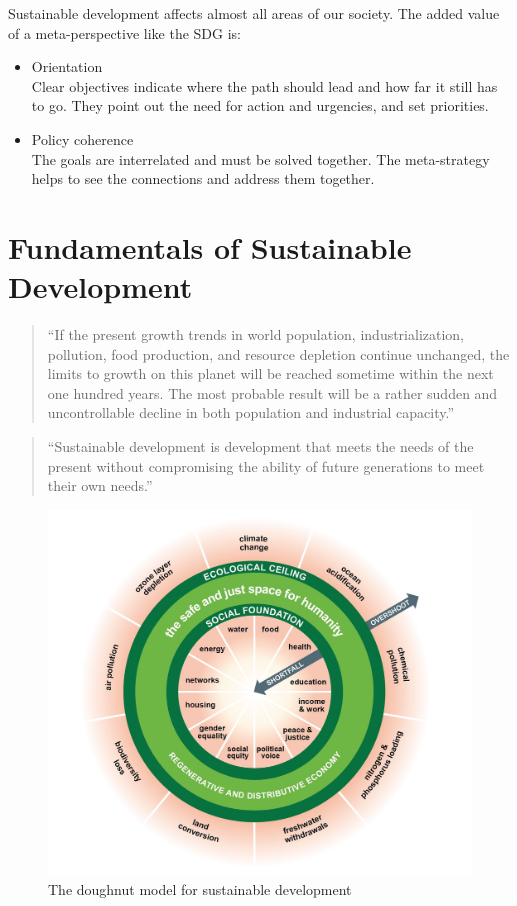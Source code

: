 \documentclass[11pt]{article}
\theoremstyle{definition}
\begin{document}
Sustainable development affects almost all areas of our society. The added value of a meta-perspective like the SDG is:
\begin{itemize}
	\item Orientation\\
	Clear objectives indicate where the path should lead and how far it still has to go. They point out the need for action and urgencies, and set priorities.
	\item Policy coherence\\
	The goals are interrelated and must be solved together. The meta-strategy helps to see the connections and address them together.
\end{itemize}

\section{Fundamentals of Sustainable Development}

\begin{quote}
	\textquotedblleft If the present growth trends in world population, industrialization, pollution, food production, and resource depletion continue unchanged, the limits to growth on this planet will be reached sometime within the next one hundred years. The most probable result will be a rather sudden and uncontrollable decline in both population and industrial capacity.\textquotedblright
\end{quote}

\begin{quote}
	\textquotedblleft Sustainable development is development that meets the needs of the present without compromising the ability of future generations to meet their own needs.\textquotedblright
\end{quote}

\begin{figure}[H]
	\centering
	\includegraphics[width=0.6\linewidth]{img/doughnut_model.png}
	\caption{The doughnut model for sustainable development}
\end{figure}
\end{document}
